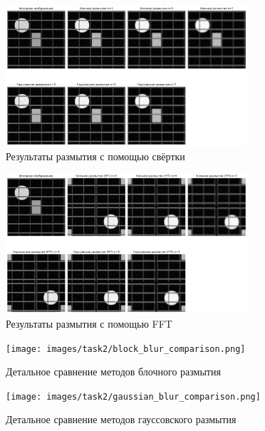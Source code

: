 \begin{figure}[H]
    \centering
    \includegraphics[width=0.8\textwidth]{images/task2/convolution_results.png}
    \caption{Результаты размытия с помощью свёртки}
    \label{fig:convolution_blur}
\end{figure}

\begin{figure}[H]
    \centering
    \includegraphics[width=0.8\textwidth]{images/task2/fft_results.png}
    \caption{Результаты размытия с помощью FFT}
    \label{fig:fft_blur}
\end{figure}

\begin{figure}[H]
    \centering
    \texttt{[image: images/task2/block\_blur\_comparison.png]}
    \caption{Детальное сравнение методов блочного размытия}
    \label{fig:block_blur_comparison}
\end{figure}

\begin{figure}[H]
    \centering
    \texttt{[image: images/task2/gaussian\_blur\_comparison.png]}
    \caption{Детальное сравнение методов гауссовского размытия}
    \label{fig:gaussian_blur_comparison}
\end{figure}

